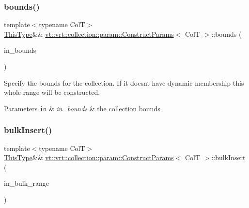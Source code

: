 \subsubsection{\texorpdfstring{bounds()}{bounds()}}
{\footnotesize\ttfamily template$<$typename ColT$>$ \\
\hyperlink{structvt_1_1vrt_1_1collection_1_1param_1_1_construct_params_a13d4910c0f6825c7b0ddfebce5288bea}{This\+Type}\&\& \hyperlink{structvt_1_1vrt_1_1collection_1_1param_1_1_construct_params}{vt\+::vrt\+::collection\+::param\+::\+Construct\+Params}$<$ ColT $>$\+::bounds (\begin{DoxyParamCaption}\item[{\hyperlink{structvt_1_1vrt_1_1collection_1_1param_1_1_construct_params_a7bc8d5d57e377e0f2e60031582eeb7e6}{Index\+Type}}]{in\+\_\+bounds }\end{DoxyParamCaption})\hspace{0.3cm}{\ttfamily [inline]}}



Specify the bounds for the collection. If it doesn\textquotesingle{}t have dynamic membership this whole range will be constructed. 


\begin{DoxyParams}[1]{Parameters}
\mbox{\tt in}  & {\em in\+\_\+bounds} & the collection bounds \\
\hline
\end{DoxyParams}
\mbox{\label{structvt_1_1vrt_1_1collection_1_1param_1_1_construct_params_af03cf3f305c56e36de87c537e8356f0a}} 
\subsubsection{\texorpdfstring{bulk\+Insert()}{bulkInsert()}\hspace{0.1cm}{\footnotesize\ttfamily [1/2]}}
{\footnotesize\ttfamily template$<$typename ColT$>$ \\
\hyperlink{structvt_1_1vrt_1_1collection_1_1param_1_1_construct_params_a13d4910c0f6825c7b0ddfebce5288bea}{This\+Type}\&\& \hyperlink{structvt_1_1vrt_1_1collection_1_1param_1_1_construct_params}{vt\+::vrt\+::collection\+::param\+::\+Construct\+Params}$<$ ColT $>$\+::bulk\+Insert (\begin{DoxyParamCaption}\item[{\hyperlink{structvt_1_1vrt_1_1collection_1_1param_1_1_construct_params_a7bc8d5d57e377e0f2e60031582eeb7e6}{Index\+Type}}]{in\+\_\+bulk\+\_\+range }\end{DoxyParamCaption})\hspace{0.3cm}{\ttfamily [inline]}}



